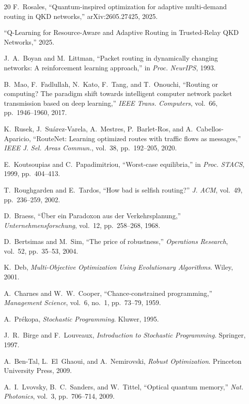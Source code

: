 \documentclass[10pt,a4paper]{article}
\begin{document}
\begin{thebibliography}{20}
F.~Rosales, ``Quantum-inspired optimization for adaptive multi-demand
routing in QKD networks,''
arXiv:2605.27425, 2025.

``Q-Learning for Resource-Aware and Adaptive Routing in Trusted-Relay
QKD Networks,'' 2025.

J.~A.~Boyan and M.~Littman,
``Packet routing in dynamically changing networks: A reinforcement
learning approach,''
in \emph{Proc. NeurIPS}, 1993.

B.~Mao, F.~Fadlullah, N.~Kato, F.~Tang, and T.~Onouchi,
``Routing or computing? The paradigm shift towards intelligent computer
network packet transmission based on deep learning,''
\emph{IEEE Trans. Computers}, vol.~66, pp.~1946--1960, 2017.

K.~Rusek, J.~Su\'arez-Varela, A.~Mestres, P.~Barlet-Ros, and
A.~Cabellos-Aparicio, ``RouteNet: Learning optimized routes with
traffic flows as messages,''
\emph{IEEE J. Sel. Areas Commun.}, vol.~38, pp.~192--205, 2020.

E.~Koutsoupias and C.~Papadimitriou,
``Worst-case equilibria,''
in \emph{Proc. STACS}, 1999, pp.~404--413.

T.~Roughgarden and E.~Tardos,
``How bad is selfish routing?''
\emph{J. ACM}, vol.~49, pp.~236--259, 2002.

D.~Braess, ``\"Uber ein Paradoxon aus der Verkehrsplanung,''
\emph{Unternehmensforschung}, vol.~12, pp.~258--268, 1968.

D.~Bertsimas and M.~Sim, ``The price of robustness,''
\emph{Operations Research}, vol.~52, pp.~35--53, 2004.

K.~Deb, \emph{Multi-Objective Optimization Using Evolutionary
Algorithms}.  Wiley, 2001.

A.~Charnes and W.~W.~Cooper,
``Chance-constrained programming,''
\emph{Management Science}, vol.~6, no.~1, pp.~73--79, 1959.

A.~Pr\'ekopa, \emph{Stochastic Programming}.  Kluwer, 1995.

J.~R.~Birge and F.~Louveaux, \emph{Introduction to Stochastic
Programming}.  Springer, 1997.

A.~Ben-Tal, L.~El~Ghaoui, and A.~Nemirovski, \emph{Robust
Optimization}.  Princeton University Press, 2009.

A.~I.~Lvovsky, B.~C.~Sanders, and W.~Tittel,
``Optical quantum memory,''
\emph{Nat. Photonics}, vol.~3, pp.~706--714, 2009.

\end{thebibliography}
\end{document}
